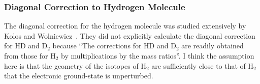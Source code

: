 \subsubsection{Diagonal Correction to Hydrogen Molecule}
The diagonal correction for the hydrogen molecule was studied extensively by Kolos and Wolniewicz~\cite{Koos1964,Kolos1968,Wolniewicz1983}. They did not explicitly calculate the diagonal correction for HD and D$_2$ because ``The corrections for HD and D$_2$ are readily obtained from those for H$_2$ by multiplications by the mass ratios''. I think the assumption here is that the geometry of the isotopes of H$_2$ are sufficiently close to that of H$_2$ that the electronic ground-state is unperturbed.